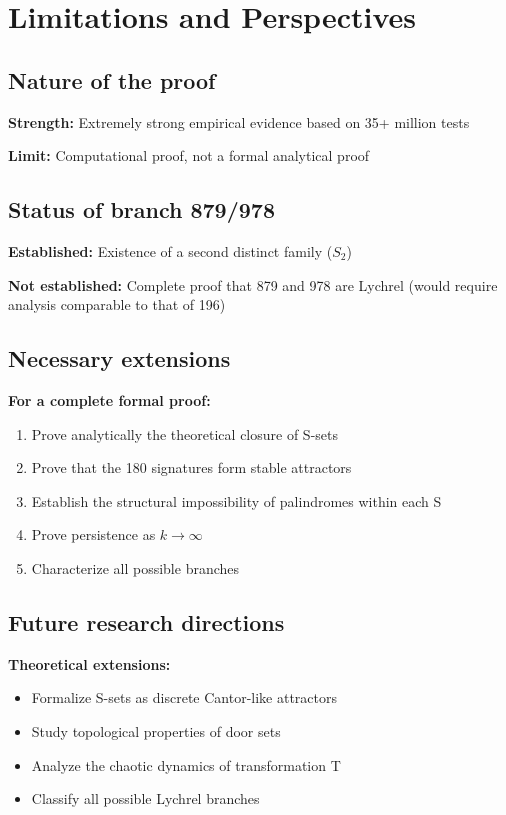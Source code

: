 \documentclass[12pt,a4paper]{article}
\theoremstyle{remark}
\begin{document}
\section{Limitations and Perspectives}
\label{sec:limitations_en}

\subsection{Nature of the proof}

\textbf{Strength:} Extremely strong empirical evidence based on 35+ million tests

\textbf{Limit:} Computational proof, not a formal analytical proof

\subsection{Status of branch 879/978}

\textbf{Established:} Existence of a second distinct family ($S_2$)

\textbf{Not established:} Complete proof that 879 and 978 are Lychrel (would require analysis comparable to that of 196)

\subsection{Necessary extensions}

\textbf{For a complete formal proof:}
\begin{enumerate}
\item Prove analytically the theoretical closure of S-sets
\item Prove that the 180 signatures form stable attractors
\item Establish the structural impossibility of palindromes within each S
\item Prove persistence as $k \to \infty$
\item Characterize all possible branches
\end{enumerate}

\subsection{Future research directions}

\textbf{Theoretical extensions:}
\begin{itemize}
\item Formalize S-sets as discrete Cantor-like attractors
\item Study topological properties of door sets
\item Analyze the chaotic dynamics of transformation T
\item Classify all possible Lychrel branches
\end{itemize}
\end{document}
